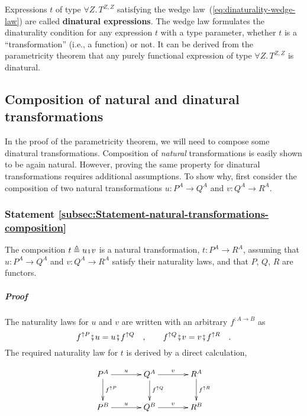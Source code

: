 Expressions $t$ of type $\forall Z.\,T^{Z,Z}$ satisfying the wedge
law~(\ref{eq:dinaturality-wedge-law}) are called \textbf{dinatural
expressions}. The wedge law formulates
the dinaturality condition for any expression $t$ with a type parameter,
whether $t$ is a \textsf{``}transformation\textsf{''} (i.e., a function) or not.
It can be derived from the parametricity theorem that any purely functional
expression of type $\forall Z.\,T^{Z,Z}$ is dinatural.

\subsection{Composition of natural and dinatural transformations}

In the proof of the parametricity theorem, we will need to compose
some dinatural transformations. Composition of \emph{natural} transformations
is easily shown to be again natural. However, proving the same property
for dinatural transformations requires additional assumptions. To
show why, first consider the composition of two natural transformations
$u:P^{A}\rightarrow Q^{A}$ and $v:Q^{A}\rightarrow R^{A}$.

\subsubsection{Statement \label{subsec:Statement-natural-transformations-composition}\ref{subsec:Statement-natural-transformations-composition}}

The composition $t\triangleq u\bef v$ is a natural transformation,
$t:P^{A}\rightarrow R^{A}$, assuming that $u:P^{A}\rightarrow Q^{A}$
and $v:Q^{A}\rightarrow R^{A}$ satisfy their naturality laws, and
that $P$, $Q$, $R$ are functors.

\subparagraph{Proof}

The naturality laws for $u$ and $v$ are written with an arbitrary
$f^{:A\rightarrow B}$ as
\[
f^{\uparrow P}\bef u=u\bef f^{\uparrow Q}\quad,\quad\quad f^{\uparrow Q}\bef v=v\bef f^{\uparrow R}\quad.
\]
The required naturality law for $t$ is derived by a direct calculation,

\begin{wrapfigure}[6]{l}{0.4\columnwidth}%
\vspace{-1.5\baselineskip}
\[
\xymatrix{\xyScaleY{2.0pc}\xyScaleX{3.0pc}P^{A}\ar[d]\sp(0.45){f^{\uparrow P}}\ar[r]\sp(0.5){u} & Q^{A}\ar[d]\sp(0.45){f^{\uparrow Q}}\ar[r]\sp(0.5){v} & R^{A}\ar[d]\sp(0.45){f^{\uparrow R}}\\
P^{B}\ar[r]\sp(0.5){u} & Q^{B}\ar[r]\sp(0.5){v} & R^{B}
}
\]

\vspace{-0\baselineskip}
\end{wrapfigure}%

